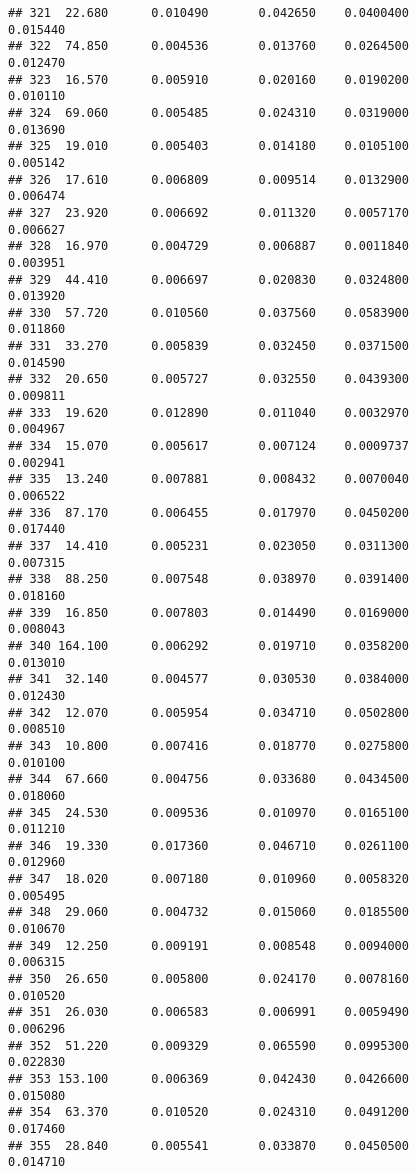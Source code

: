 \documentclass[
]{article}
\begin{document}
\begin{verbatim}
## 321  22.680      0.010490       0.042650    0.0400400          0.015440
## 322  74.850      0.004536       0.013760    0.0264500          0.012470
## 323  16.570      0.005910       0.020160    0.0190200          0.010110
## 324  69.060      0.005485       0.024310    0.0319000          0.013690
## 325  19.010      0.005403       0.014180    0.0105100          0.005142
## 326  17.610      0.006809       0.009514    0.0132900          0.006474
## 327  23.920      0.006692       0.011320    0.0057170          0.006627
## 328  16.970      0.004729       0.006887    0.0011840          0.003951
## 329  44.410      0.006697       0.020830    0.0324800          0.013920
## 330  57.720      0.010560       0.037560    0.0583900          0.011860
## 331  33.270      0.005839       0.032450    0.0371500          0.014590
## 332  20.650      0.005727       0.032550    0.0439300          0.009811
## 333  19.620      0.012890       0.011040    0.0032970          0.004967
## 334  15.070      0.005617       0.007124    0.0009737          0.002941
## 335  13.240      0.007881       0.008432    0.0070040          0.006522
## 336  87.170      0.006455       0.017970    0.0450200          0.017440
## 337  14.410      0.005231       0.023050    0.0311300          0.007315
## 338  88.250      0.007548       0.038970    0.0391400          0.018160
## 339  16.850      0.007803       0.014490    0.0169000          0.008043
## 340 164.100      0.006292       0.019710    0.0358200          0.013010
## 341  32.140      0.004577       0.030530    0.0384000          0.012430
## 342  12.070      0.005954       0.034710    0.0502800          0.008510
## 343  10.800      0.007416       0.018770    0.0275800          0.010100
## 344  67.660      0.004756       0.033680    0.0434500          0.018060
## 345  24.530      0.009536       0.010970    0.0165100          0.011210
## 346  19.330      0.017360       0.046710    0.0261100          0.012960
## 347  18.020      0.007180       0.010960    0.0058320          0.005495
## 348  29.060      0.004732       0.015060    0.0185500          0.010670
## 349  12.250      0.009191       0.008548    0.0094000          0.006315
## 350  26.650      0.005800       0.024170    0.0078160          0.010520
## 351  26.030      0.006583       0.006991    0.0059490          0.006296
## 352  51.220      0.009329       0.065590    0.0995300          0.022830
## 353 153.100      0.006369       0.042430    0.0426600          0.015080
## 354  63.370      0.010520       0.024310    0.0491200          0.017460
## 355  28.840      0.005541       0.033870    0.0450500          0.014710

\end{verbatim}
\end{document}
